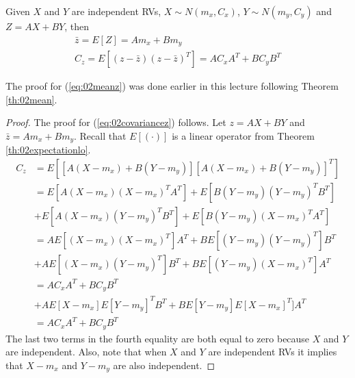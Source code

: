 \documentclass[lecture,12pt,]{pcms-l}
\theoremstyle{example}
\begin{document}
\begin{theorem}
\label{th:02covariance}
Given $X$ and $Y$ are independent RVs, $X\sim N(m_x,C_x)$, $Y\sim N(m_y,C_y)$ and $Z=AX+BY$, then
\begin{align}
\label{eq:02meanz}
\bar{z} = E[Z] = Am_x+Bm_y \\
\label{eq:02covariancez}
C_z = E[(z-\bar{z})(z-\bar{z})^T] = AC_xA^T + BC_yB^T
\end{align}
\end{theorem}
The proof for (\ref{eq:02meanz}) was done earlier in this lecture following Theorem \ref{th:02mean}.
\begin{proof}
The proof for (\ref{eq:02covariancez}) follows. Let $z=AX+BY$ and $\bar{z}=Am_x+Bm_y$. Recall that $E[(\cdot)]$ is a linear operator from Theorem \ref{th:02expectationlo}.
\begin{align*}
C_z &= E\left[[A(X-m_x)+B(Y-m_y)][A(X-m_x)+B(Y-m_y)]^T\right] \\
&= E[A(X-m_x)(X-m_x)^TA^T] + E[B(Y-m_y)(Y-m_y)^TB^T] \\
&+ E[A(X-m_x)(Y-m_y)^TB^T] + E[B(Y-m_y)(X-m_x)^TA^T] \\
&= AE[(X-m_x)(X-m_x)^T]A^T + BE[(Y-m_y)(Y-m_y)^T]B^T \\
&+ AE[(X-m_x)(Y-m_y)^T]B^T + BE[(Y-m_y)(X-m_x)^T]A^T \\
&= AC_xA^T + BC_yB^T \\
&+ AE[X-m_x]E[Y-m_y]^TB^T + BE[Y-m_y]E[X-m_x]^T]A^T \\
&= AC_xA^T + BC_yB^T
\end{align*}
The last two terms in the fourth equality are both equal to zero because $X$ and $Y$ are independent. Also, note that when $X$ and $Y$ are independent RVs it implies that $X-m_x$ and $Y-m_y$ are also independent.
\end{proof}
\end{document}
